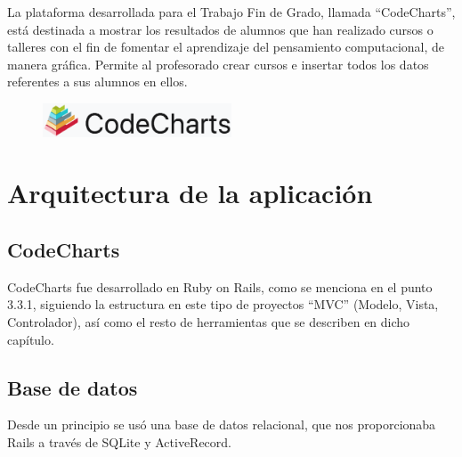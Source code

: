 
La plataforma desarrollada para el Trabajo Fin de Grado, llamada ``CodeCharts'', está destinada a mostrar los resultados de alumnos que han realizado cursos o talleres con el fin de fomentar el aprendizaje del pensamiento computacional, de manera gráfica.
Permite al profesorado crear cursos e insertar todos los datos referentes a sus alumnos en ellos.

\begin{figure}[!th]
\begin{center}
\includegraphics[width=0.5\textwidth]{images/logo_plataforma.eps}
\label{fig:9}
\end{center}
\end{figure}


\section{Arquitectura de la aplicación}
\label{4:sec:1}

\subsection{CodeCharts}
\label{1:sec:1}

CodeCharts fue desarrollado en Ruby on Rails, como se menciona en el punto 3.3.1, siguiendo la estructura en este tipo de proyectos ``MVC'' (Modelo, Vista, Controlador), así como el resto de herramientas que se describen en dicho capítulo.


\newpage
\subsection{Base de datos}
\label{1:sec:2}

Desde un principio se usó una base de datos relacional, que nos proporcionaba Rails a través de SQLite y ActiveRecord.

